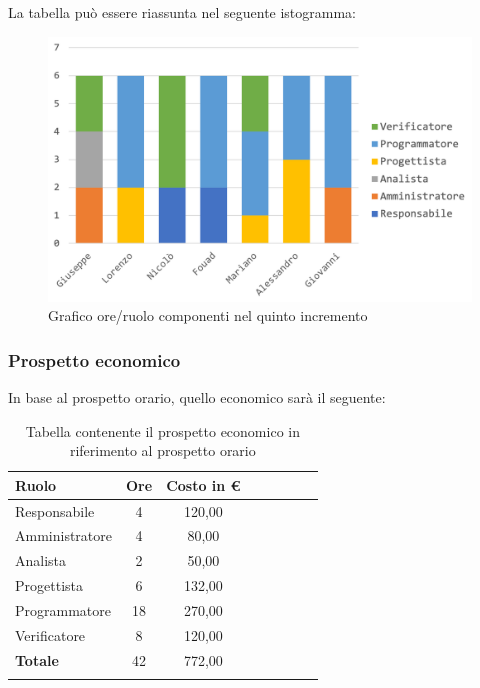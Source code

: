 		La tabella può essere riassunta nel seguente istogramma:
		\begin{figure}[H]
			\centering
			\includegraphics[width=0.8\linewidth]{./images/preventivo/incremento5-1.png}
			\caption{Grafico ore/ruolo componenti nel quinto incremento}
			\label{fig:grafico suddivione ruoli incremento V}
		\end{figure}
		
		\subsubsection{Prospetto economico}
		In base al prospetto orario, quello economico sarà il seguente: 
		
		\begin{longtable}{|l|c|c|c|c|c|c|c|}
			\hline
			\rowcolor{lighter-grayer}
			\textbf{Ruolo} & \textbf{Ore} & \textbf{Costo in € } \\
			\hline
			\endfirsthead
			
			\hline
			Responsabile 	    & 4 & 120,00\\
			\hline 
			\hline
			Amministratore	   & 4 & 80,00\\
			\hline
			\hline
			Analista 				& 2 & 50,00\\
			\hline
			\hline
			Progettista 		   & 6 & 132,00\\
			\hline
			\hline
			Programmatore 	  & 18 & 270,00\\
			\hline
			\hline
			Verificatore 		   & 8 & 120,00\\
			\hline
			\textbf{Totale} 	 & 42 & 772,00\\
			\hline
			\caption{Tabella contenente il prospetto economico in riferimento al prospetto orario}
		\end{longtable}
		\pagebreak
		
